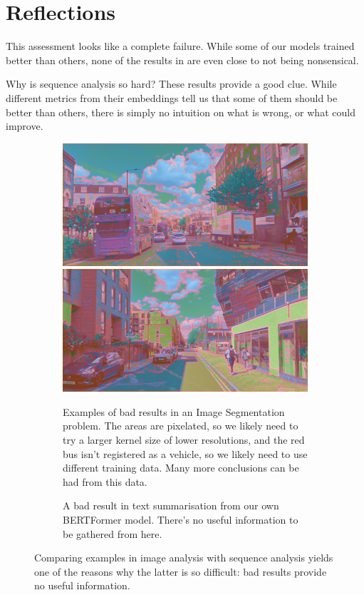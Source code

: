 \section{Reflections}
\label{reflections_section}

This assessment looks like a complete failure.
While some of our models trained better than others, none of the results in \appendixA{} are even close to not being nonsensical.

Why is sequence analysis so hard? These results provide a good clue.
While different metrics from their embeddings tell us that some of them should be better than others, there is simply no intuition on what is wrong, or what could improve.

\begin{figure}[h]
	\begin{subfigure}[][265pt][t]{.48\textwidth}
		\includegraphics[width=\textwidth]{bad_convolutional_result.png}
		\includegraphics[width=\textwidth]{bad_convolutional_result_2.png}
		\caption{Examples of bad results in an Image Segmentation problem. The areas are pixelated, so we likely need to try a larger kernel size of lower resolutions, and the red bus isn't registered as a vehicle, so we likely need to use different training data. Many more conclusions can be had from this data.} 
	\end{subfigure}\hfill{}%
	\begin{subfigure}[][265pt][t]{.48\textwidth}
		
		\caption{A bad result in text summarisation from our own BERTFormer model. There's no useful information to be gathered from here.}
	\end{subfigure}
	\caption{Comparing examples in image analysis with sequence analysis yields one of the reasons why the latter is so difficult: bad results provide no useful information.}
\end{figure}

